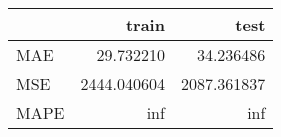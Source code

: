 \begin{tabular}{lrr}
\toprule
{} &        train &         test \\
\midrule
MAE  &    29.732210 &    34.236486 \\
MSE  &  2444.040604 &  2087.361837 \\
MAPE &          inf &          inf \\
\bottomrule
\end{tabular}
